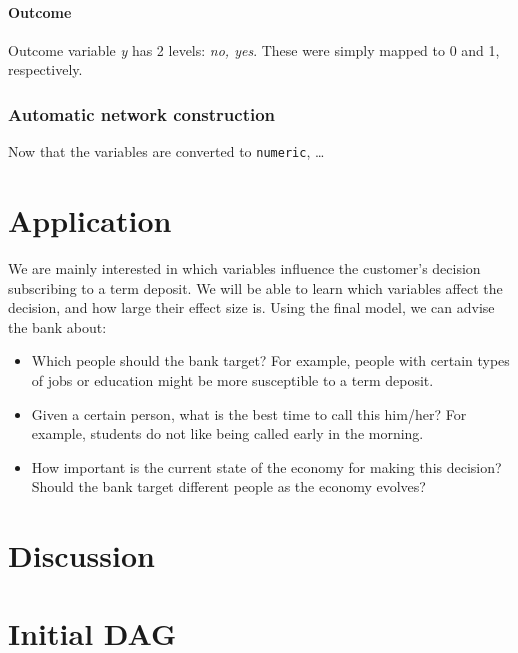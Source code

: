 \documentclass[11pt,]{article}
\providecommand{\tightlist}{%
  \setlength{\itemsep}{0pt}\setlength{\parskip}{0pt}}
\let\oldparagraph\paragraph
\renewcommand{\paragraph}[1]{\oldparagraph{#1}\mbox{}}
\begin{document}
\begin{multicols}{2}
\hypertarget{outcome}{%
\paragraph{Outcome}\label{outcome}}

Outcome variable \emph{y} has 2 levels: \emph{no, yes}. These were
simply mapped to 0 and 1, respectively.

\hypertarget{automatic-network-construction}{%
\subsubsection{Automatic network
construction}\label{automatic-network-construction}}

Now that the variables are converted to \texttt{numeric}, \ldots{}

\hypertarget{application}{%
\section{Application}\label{application}}

We are mainly interested in which variables influence the customer's
decision subscribing to a term deposit. We will be able to learn which
variables affect the decision, and how large their effect size is. Using
the final model, we can advise the bank about:

\begin{itemize}
\tightlist
\item
  Which people should the bank target? For example, people with certain
  types of jobs or education might be more susceptible to a term
  deposit.
\item
  Given a certain person, what is the best time to call this him/her?
  For example, students do not like being called early in the morning.
\item
  How important is the current state of the economy for making this
  decision? Should the bank target different people as the economy
  evolves?
\end{itemize}

\hypertarget{discussion}{%
\section{Discussion}\label{discussion}}

\end{multicols}
\newpage
\appendix

\hypertarget{initial-dag}{%
\section{Initial DAG}\label{initial-dag}}
\end{document}
